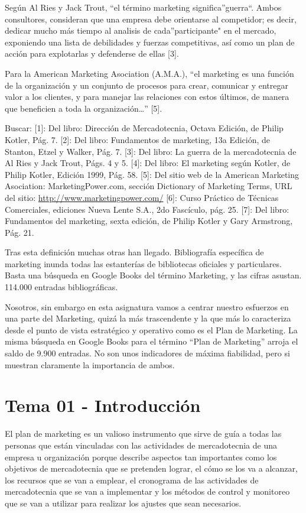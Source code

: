 \documentclass[
]{book}
\begin{document}
Según Al Ries y Jack Trout, ``el término marketing significa''guerra``. Ambos consultores, consideran que una empresa debe orientarse al competidor; es decir, dedicar mucho más tiempo al analisis de cada''participante" en el mercado, exponiendo una lista de debilidades y fuerzas competitivas, así como un plan de acción para explotarlas y defenderse de ellas {[}3{]}.

Para la American Marketing Asociation (A.M.A.), ``el marketing es una función de la organización y un conjunto de procesos para crear, comunicar y entregar valor a los clientes, y para manejar las relaciones con estos últimos, de manera que beneficien a toda la organización\ldots{}'' {[}5{]}.

Buscar: {[}1{]}: Del libro: Dirección de Mercadotecnia, Octava Edición, de Philip Kotler, Pág. 7.
{[}2{]}: Del libro: Fundamentos de marketing, 13a Edición, de Stanton, Etzel y Walker, Pág. 7.
{[}3{]}: Del libro: La guerra de la mercadotecnia de Al Ries y Jack Trout, Págs. 4 y 5.
{[}4{]}: Del libro: El marketing según Kotler, de Philip Kotler, Edición 1999, Pág. 58.
{[}5{]}: Del sitio web de la American Marketing Asociation: MarketingPower.com, sección Dictionary of Marketing Terms, URL del sitio: \url{http://www.marketingpower.com/}
{[}6{]}: Curso Práctico de Técnicas Comerciales, ediciones Nueva Lente S.A., 2do Fascículo, pág. 25.
{[}7{]}: Del libro: Fundamentos del marketing, sexta edición, de Philip Kotler y Gary Armstrong, Pág. 21.

Tras esta definición muchas otras han llegado. Bibliografía específica de marketing inunda todas las estanterías de bibliotecas oficiales y particulares. Basta una búsqueda en Google Books del término Marketing, y las cifras asustan. 114.000 entradas bibliográficas.

Nosotros, sin embargo en esta asignatura vamos a centrar nuestro esfuerzos en una parte del Marketing, quizá la más trascendente y la que más lo caracteriza desde el punto de vista estratégico y operativo como es el Plan de Marketing. La misma búsqueda en Google Books para el término ``Plan de Marketing'' arroja el saldo de 9.900 entradas. No son unos indicadores de máxima fiabilidad, pero si muestran claramente la importancia de ambos.

\hypertarget{tema01}{%
\chapter{Tema 01 - Introducción}\label{tema01}}

El plan de marketing es un valioso instrumento que sirve de guía a todas las personas que están vinculadas con las actividades de mercadotecnia de una empresa u organización porque describe aspectos tan importantes como los objetivos de mercadotecnia que se pretenden lograr, el cómo se los va a alcanzar, los recursos que se van a emplear, el cronograma de las actividades de mercadotecnia que se van a implementar y los métodos de control y monitoreo que se van a utilizar para realizar los ajustes que sean necesarios.
\end{document}
